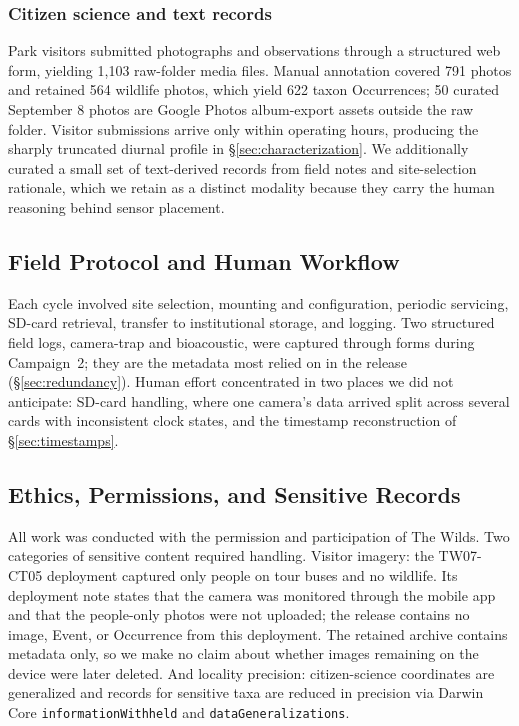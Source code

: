 \documentclass[sigconf]{acmart}
\begin{document}
\subsubsection{Citizen science and text records}
Park visitors submitted photographs and observations through a
structured web form, yielding 1{,}103 raw-folder media files. Manual annotation
covered 791 photos and retained 564 wildlife photos, which yield 622 taxon
Occurrences; 50 curated September 8 photos are Google Photos album-export assets
outside the raw folder. Visitor submissions arrive only within operating hours,
producing the sharply truncated
diurnal profile in \S\ref{sec:characterization}. We additionally
curated a small set of text-derived records from field notes and
site-selection rationale, which we retain as a distinct modality
because they carry the human reasoning behind sensor placement.

\subsection{Field Protocol and Human Workflow}

Each cycle involved site selection, mounting and configuration,
periodic servicing, SD-card retrieval, transfer to institutional
storage, and logging. Two structured field logs, camera-trap and
bioacoustic, were captured through forms during Campaign~2; they are the
metadata most relied on in the release (\S\ref{sec:redundancy}). Human effort concentrated in two places we did
not anticipate: SD-card handling, where one camera's data arrived split
across several cards with inconsistent clock states, and the timestamp
reconstruction of \S\ref{sec:timestamps}.

\subsection{Ethics, Permissions, and Sensitive Records}

All work was conducted with the permission and participation of The
Wilds. Two categories of sensitive content required handling. Visitor
imagery: the TW07-CT05 deployment captured only people on tour buses and
no wildlife. Its deployment note states that the camera was monitored
through the mobile app and that the people-only photos were not uploaded;
the release contains no image, Event, or Occurrence from this deployment.
The retained archive contains metadata only, so we make no claim about
whether images remaining on the device were later deleted. And locality precision: citizen-science
coordinates are generalized and records for sensitive taxa are reduced
in precision via Darwin Core \texttt{informationWithheld} and
\texttt{dataGeneralizations}.
\end{document}
